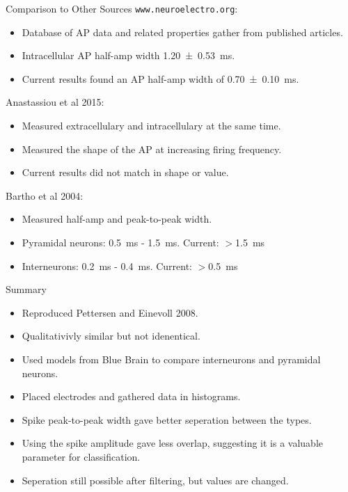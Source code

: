 \documentclass[aspectratio=169]{beamer}
\begin{document}
\begin{frame}[fragile]{Comparison to Other Sources}
    \verb+www.neuroelectro.org+:
    \begin{itemize}
        \item Database of AP data and related properties gather from published articles. 
        \item Intracellular AP half-amp width 
            \SI[separate-uncertainty = true]{1.20 \pm 0.53}{\milli\second}.
        \item Current results found an AP half-amp width of
            \SI[separate-uncertainty = true]{0.70 \pm 0.10}{\milli\second}.
    \end{itemize}
    Anastassiou et al 2015:
    \begin{itemize}
        \item Measured extracellulary and intracellulary at the same time. 
        \item Measured the shape of the AP at increasing firing frequency. 
        \item Current results did not match in shape or value. 
    \end{itemize}
    Bartho et al 2004:
    \begin{itemize}
        \item Measured half-amp and peak-to-peak width. 
        \item Pyramidal neurons: \SI{0.5}{\milli\second} - \SI{1.5}{\milli\second}.
            Current: $>$\SI{1.5}{\milli\second}
        \item Interneurons: \SI{0.2}{\milli\second} - \SI{0.4}{\milli\second}.
            Current: $>$\SI{0.5}{\milli\second}
    \end{itemize}
\end{frame}

\begin{frame}{Summary}
    \begin{itemize}
        \item Reproduced Pettersen and Einevoll 2008. 
        \item Qualitativivly similar but not idenentical. 
        \item Used models from Blue Brain to compare interneurons and pyramidal neurons.
        \item Placed electrodes and gathered data in histograms. 
        \item Spike peak-to-peak width gave better seperation between the types.
        \item Using the spike amplitude gave less overlap, suggesting it is a valuable 
            parameter for classification. 
        \item Seperation still possible after filtering, but values are changed.
    \end{itemize}
\end{frame}
\end{document}
